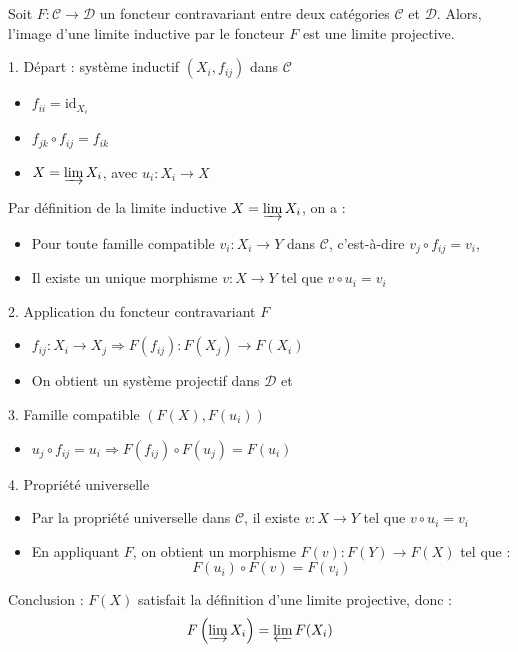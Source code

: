\documentclass[9pt]{beamer}
\begin{document}
\begin{frame}
 \begin{theorem}
Soit \( F: \mathcal{C} \to \mathcal{D} \) un foncteur contravariant entre deux catégories \( \mathcal{C} \) et \( \mathcal{D} \). Alors, l'image d'une limite inductive par le foncteur $F$ est une limite projective.
 \end{theorem}

	1. Départ : système inductif \((X_i, f_{ij})\) dans \( \mathcal{C} \)
\begin{itemize}
	\item \( f_{ii} = \text{id}_{X_i} \)
	\item \( f_{jk} \circ f_{ij} = f_{ik} \)
	\item \( X = \varinjlim X_i \), avec \( u_i: X_i \to X \)
\end{itemize}
Par définition de la limite inductive \( X = \varinjlim X_i \), on a :
\begin{itemize}
	\item Pour toute famille compatible \( v_i: X_i \to Y \) dans \( \mathcal{C} \), c’est-à-dire \( v_j \circ f_{ij} = v_i \),
	\item Il existe un unique morphisme \( v: X \to Y \) tel que \( v \circ u_i = v_i \)
\end{itemize}

2. Application du foncteur contravariant \( F \)
\begin{itemize}
	\item \( f_{ij}: X_i \to X_j \Rightarrow F(f_{ij}): F(X_j) \to F(X_i) \)
	\item On obtient un système projectif dans \( \mathcal{D} \) et 
\end{itemize}

3. Famille compatible \((F(X), F(u_i))\)
\begin{itemize}
	\item \( u_j \circ f_{ij} = u_i \Rightarrow F(f_{ij}) \circ F(u_j) = F(u_i) \)
\end{itemize}

\end{frame}


\begin{frame}
	4. Propriété universelle
\begin{itemize}
	\item Par la propriété universelle dans \( \mathcal{C} \), il existe \( v: X \to Y \) tel que \( v \circ u_i = v_i \)
	\item En appliquant \( F \), on obtient un morphisme \( F(v): F(Y) \to F(X) \) tel que :
	\[
	F(u_i) \circ F(v) = F(v_i)
	\]
\end{itemize}

	Conclusion : \( F(X) \) satisfait la définition d'une limite projective, donc :
\[
F\left( \varinjlim X_i \right) = \varprojlim F(X_i)
\]

\end{frame}
\end{document}
